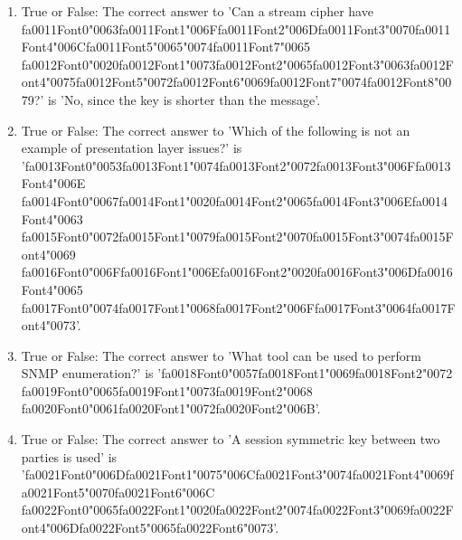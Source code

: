 \documentclass[12pt]{article}
\begin{document}
\begin{enumerate}[label=\arabic*.]
\item True or False: The correct answer to 'Can a stream cipher have {\csname fa0011Font0\endcsname\char"0063}{\csname fa0011Font1\endcsname\char"006F}{\csname fa0011Font2\endcsname\char"006D}{\csname fa0011Font3\endcsname\char"0070}{\csname fa0011Font4\endcsname\char"006C}{\csname fa0011Font5\endcsname\char"0065}{\char"0074}{\csname fa0011Font7\endcsname\char"0065} {\csname fa0012Font0\endcsname\char"0020}{\csname fa0012Font1\endcsname\char"0073}{\csname fa0012Font2\endcsname\char"0065}{\csname fa0012Font3\endcsname\char"0063}{\csname fa0012Font4\endcsname\char"0075}{\csname fa0012Font5\endcsname\char"0072}{\csname fa0012Font6\endcsname\char"0069}{\csname fa0012Font7\endcsname\char"0074}{\csname fa0012Font8\endcsname\char"0079}?' is 'No, since the key is shorter than the message'.
\item True or False: The correct answer to 'Which of the following is not an example of presentation layer issues?' is '{\csname fa0013Font0\endcsname\char"0053}{\csname fa0013Font1\endcsname\char"0074}{\csname fa0013Font2\endcsname\char"0072}{\csname fa0013Font3\endcsname\char"006F}{\csname fa0013Font4\endcsname\char"006E} {\csname fa0014Font0\endcsname\char"0067}{\csname fa0014Font1\endcsname\char"0020}{\csname fa0014Font2\endcsname\char"0065}{\csname fa0014Font3\endcsname\char"006E}{\csname fa0014Font4\endcsname\char"0063} {\csname fa0015Font0\endcsname\char"0072}{\csname fa0015Font1\endcsname\char"0079}{\csname fa0015Font2\endcsname\char"0070}{\csname fa0015Font3\endcsname\char"0074}{\csname fa0015Font4\endcsname\char"0069} {\csname fa0016Font0\endcsname\char"006F}{\csname fa0016Font1\endcsname\char"006E}{\csname fa0016Font2\endcsname\char"0020}{\csname fa0016Font3\endcsname\char"006D}{\csname fa0016Font4\endcsname\char"0065} {\csname fa0017Font0\endcsname\char"0074}{\csname fa0017Font1\endcsname\char"0068}{\csname fa0017Font2\endcsname\char"006F}{\csname fa0017Font3\endcsname\char"0064}{\csname fa0017Font4\endcsname\char"0073}'.
\item True or False: The correct answer to 'What tool can be used to perform SNMP enumeration?' is '{\csname fa0018Font0\endcsname\char"0057}{\csname fa0018Font1\endcsname\char"0069}{\csname fa0018Font2\endcsname\char"0072} {\csname fa0019Font0\endcsname\char"0065}{\csname fa0019Font1\endcsname\char"0073}{\csname fa0019Font2\endcsname\char"0068} {\csname fa0020Font0\endcsname\char"0061}{\csname fa0020Font1\endcsname\char"0072}{\csname fa0020Font2\endcsname\char"006B}'.
\item True or False: The correct answer to 'A session symmetric key between two parties is used' is '{\csname fa0021Font0\endcsname\char"006D}{\csname fa0021Font1\endcsname\char"0075}{\char"006C}{\csname fa0021Font3\endcsname\char"0074}{\csname fa0021Font4\endcsname\char"0069}{\csname fa0021Font5\endcsname\char"0070}{\csname fa0021Font6\endcsname\char"006C} {\csname fa0022Font0\endcsname\char"0065}{\csname fa0022Font1\endcsname\char"0020}{\csname fa0022Font2\endcsname\char"0074}{\csname fa0022Font3\endcsname\char"0069}{\csname fa0022Font4\endcsname\char"006D}{\csname fa0022Font5\endcsname\char"0065}{\csname fa0022Font6\endcsname\char"0073}'.

\end{enumerate}
\end{document}
